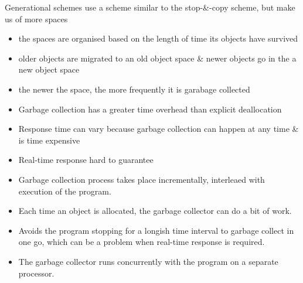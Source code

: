Generational schemes use a scheme similar to the stop-\&-copy scheme, but make us of more 
spaces
\begin{itemize}
    \item the spaces are organised based on the length of time its objects have survived
    \item older objects are migrated to an old object space \& newer objects go in the a 
    new object space
    \item the newer the space, the more frequently it is garabage collected
\end{itemize}

\begin{itemize}
    \item Garbage collection has a greater time overhead than explicit deallocation
    \item Response time can vary because garbage collection can happen at any time 
    \& is time expensive
    \item Real-time response hard to guarantee
\end{itemize}

\begin{itemize}
    \item Garbage collection process takes place incrementally, interleaed with 
    execution of the program.
    \item Each time an object is allocated, the garbage collector can do a bit 
    of work.
    \item Avoids the program stopping for a longish time interval to garbage 
    collect in one go, which can be a problem when real-time response is required.
\end{itemize}

\begin{itemize}
    \item The garbage collector runs concurrently with the program on a separate 
    processor.
\end{itemize}